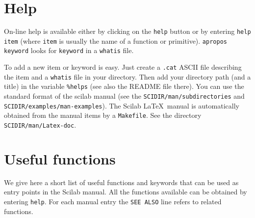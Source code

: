 \section{Help}
On-line help is available either by clicking on the 
{\tt help}
button or by entering {\tt help item} (where {\tt item} is usually the 
name of a function or primitive). {\tt apropos
keyword} looks 
for {\tt keyword} in a {\tt whatis} file. 

 To add a new item or keyword is easy.
Just create a {\tt .cat} ASCII file describing the item and a 
{\tt whatis} file in your directory. 
Then add your directory path
(and a title) in the variable \verb!%helps! (see also the README file
there). You can use the standard format of the scilab manual
(see the {\tt SCIDIR/man/subdirectories} 
and {\tt SCIDIR/examples/man-examples}).
The Scilab \LaTeX\   manual is automatically obtained from the
manual items by a {\tt Makefile}. 
See the directory {\tt SCIDIR/man/Latex-doc}. 

\section{Useful functions}

We give here a short list of useful functions and keywords that can be used
as entry points in the Scilab manual. All the functions available 
can be obtained by entering {\tt help}. For each manual entry the
{\tt SEE ALSO} line refers to related functions.

